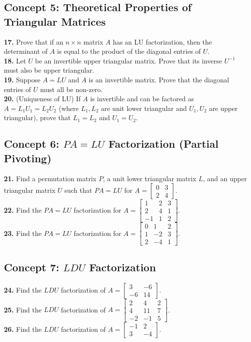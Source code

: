 \documentclass[11pt]{article}
\begin{document}
\subsection*{Concept 5: Theoretical Properties of Triangular Matrices}
\textbf{17.} Prove that if an $n \times n$ matrix $A$ has an LU factorization, then the determinant of $A$ is equal to the product of the diagonal entries of $U$. \\
\textbf{18.} Let $U$ be an invertible upper triangular matrix. Prove that its inverse $U^{-1}$ must also be upper triangular. \\
\textbf{19.} Suppose $A = LU$ and $A$ is an invertible matrix. Prove that the diagonal entries of $U$ must all be non-zero. \\
\textbf{20.} (Uniqueness of LU) If $A$ is invertible and can be factored as $A = L_1 U_1 = L_2 U_2$ (where $L_1, L_2$ are unit lower triangular and $U_1, U_2$ are upper triangular), prove that $L_1 = L_2$ and $U_1 = U_2$.

\subsection*{Concept 6: $PA = LU$ Factorization (Partial Pivoting)}
\textbf{21.} Find a permutation matrix $P$, a unit lower triangular matrix $L$, and an upper triangular matrix $U$ such that $PA = LU$ for $A = \begin{bmatrix} 0 & 3 \\ 2 & 4 \end{bmatrix}$. \\
\textbf{22.} Find the $PA = LU$ factorization for $A = \begin{bmatrix} 1 & 2 & 3 \\ 2 & 4 & 1 \\ -1 & 1 & 2 \end{bmatrix}$. \\
\textbf{23.} Find the $PA = LU$ factorization for $A = \begin{bmatrix} 0 & 1 & 2 \\ 1 & -2 & 3 \\ 2 & -4 & 1 \end{bmatrix}$.

\subsection*{Concept 7: $LDU$ Factorization}
\textbf{24.} Find the $LDU$ factorization of $A = \begin{bmatrix} 3 & -6 \\ -6 & 14 \end{bmatrix}$. \\
\textbf{25.} Find the $LDU$ factorization of $A = \begin{bmatrix} 2 & 4 & 2 \\ 4 & 11 & 7 \\ -2 & -1 & 5 \end{bmatrix}$. \\
\textbf{26.} Find the $LDU$ factorization of $A = \begin{bmatrix} -1 & 2 \\ 3 & -4 \end{bmatrix}$.
\end{document}
